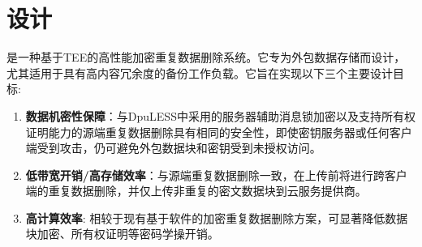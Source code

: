 \section{\sysnameS 设计}
\label{sec:sgxdedup-design}

\sysnameS 是一种基于TEE的高性能加密重复数据删除系统。它专为外包数据存储而设计，尤其适用于具有高内容冗余度的备份工作负载。它旨在实现以下三个主要设计目标:

\begin{enumerate}[leftmargin=0em, label={\arabic*.}]
    \item \textbf{数据机密性保障}：与DpuLESS中采用的服务器辅助消息锁加密以及支持所有权证明能力的源端重复数据删除具有相同的安全性，即使密钥服务器或任何客户端受到攻击，\sysnameS 仍可避免外包数据块和密钥受到未授权访问。
    \item \textbf{低带宽开销/高存储效率}：与源端重复数据删除一致，\sysnameS 在上传前将进行跨客户端的重复数据删除，并仅上传非重复的密文数据块到云服务提供商。
    \item \textbf{高计算效率}: 相较于现有基于软件的加密重复数据删除方案，\sysnameS 可显著降低数据块加密、所有权证明等密码学操开销。
\end{enumerate}

